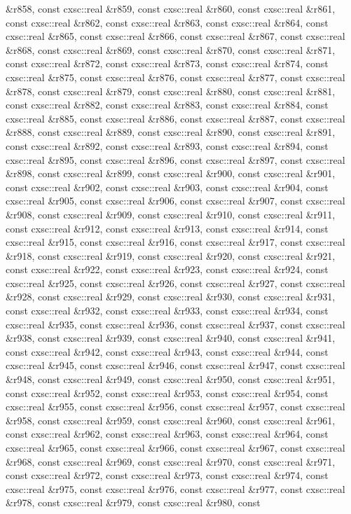 \begin{DoxyCompactItemize}
\&r858, const cxsc\-::real \&r859, const cxsc\-::real \&r860, const cxsc\-::real \&r861, const cxsc\-::real \&r862, const cxsc\-::real \&r863, const cxsc\-::real \&r864, const cxsc\-::real \&r865, const cxsc\-::real \&r866, const cxsc\-::real \&r867, const cxsc\-::real \&r868, const cxsc\-::real \&r869, const cxsc\-::real \&r870, const cxsc\-::real \&r871, const cxsc\-::real \&r872, const cxsc\-::real \&r873, const cxsc\-::real \&r874, const cxsc\-::real \&r875, const cxsc\-::real \&r876, const cxsc\-::real \&r877, const cxsc\-::real \&r878, const cxsc\-::real \&r879, const cxsc\-::real \&r880, const cxsc\-::real \&r881, const cxsc\-::real \&r882, const cxsc\-::real \&r883, const cxsc\-::real \&r884, const cxsc\-::real \&r885, const cxsc\-::real \&r886, const cxsc\-::real \&r887, const cxsc\-::real \&r888, const cxsc\-::real \&r889, const cxsc\-::real \&r890, const cxsc\-::real \&r891, const cxsc\-::real \&r892, const cxsc\-::real \&r893, const cxsc\-::real \&r894, const cxsc\-::real \&r895, const cxsc\-::real \&r896, const cxsc\-::real \&r897, const cxsc\-::real \&r898, const cxsc\-::real \&r899, const cxsc\-::real \&r900, const cxsc\-::real \&r901, const cxsc\-::real \&r902, const cxsc\-::real \&r903, const cxsc\-::real \&r904, const cxsc\-::real \&r905, const cxsc\-::real \&r906, const cxsc\-::real \&r907, const cxsc\-::real \&r908, const cxsc\-::real \&r909, const cxsc\-::real \&r910, const cxsc\-::real \&r911, const cxsc\-::real \&r912, const cxsc\-::real \&r913, const cxsc\-::real \&r914, const cxsc\-::real \&r915, const cxsc\-::real \&r916, const cxsc\-::real \&r917, const cxsc\-::real \&r918, const cxsc\-::real \&r919, const cxsc\-::real \&r920, const cxsc\-::real \&r921, const cxsc\-::real \&r922, const cxsc\-::real \&r923, const cxsc\-::real \&r924, const cxsc\-::real \&r925, const cxsc\-::real \&r926, const cxsc\-::real \&r927, const cxsc\-::real \&r928, const cxsc\-::real \&r929, const cxsc\-::real \&r930, const cxsc\-::real \&r931, const cxsc\-::real \&r932, const cxsc\-::real \&r933, const cxsc\-::real \&r934, const cxsc\-::real \&r935, const cxsc\-::real \&r936, const cxsc\-::real \&r937, const cxsc\-::real \&r938, const cxsc\-::real \&r939, const cxsc\-::real \&r940, const cxsc\-::real \&r941, const cxsc\-::real \&r942, const cxsc\-::real \&r943, const cxsc\-::real \&r944, const cxsc\-::real \&r945, const cxsc\-::real \&r946, const cxsc\-::real \&r947, const cxsc\-::real \&r948, const cxsc\-::real \&r949, const cxsc\-::real \&r950, const cxsc\-::real \&r951, const cxsc\-::real \&r952, const cxsc\-::real \&r953, const cxsc\-::real \&r954, const cxsc\-::real \&r955, const cxsc\-::real \&r956, const cxsc\-::real \&r957, const cxsc\-::real \&r958, const cxsc\-::real \&r959, const cxsc\-::real \&r960, const cxsc\-::real \&r961, const cxsc\-::real \&r962, const cxsc\-::real \&r963, const cxsc\-::real \&r964, const cxsc\-::real \&r965, const cxsc\-::real \&r966, const cxsc\-::real \&r967, const cxsc\-::real \&r968, const cxsc\-::real \&r969, const cxsc\-::real \&r970, const cxsc\-::real \&r971, const cxsc\-::real \&r972, const cxsc\-::real \&r973, const cxsc\-::real \&r974, const cxsc\-::real \&r975, const cxsc\-::real \&r976, const cxsc\-::real \&r977, const cxsc\-::real \&r978, const cxsc\-::real \&r979, const cxsc\-::real \&r980, const 
\end{DoxyCompactItemize}
